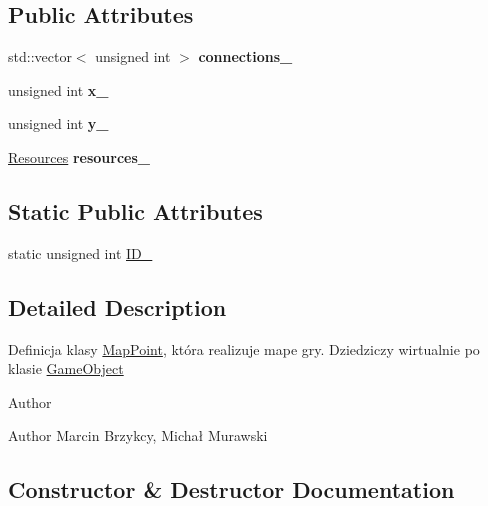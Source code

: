 \subsection*{Public Attributes}
\begin{DoxyCompactItemize}
\item 
std\+::vector$<$ unsigned int $>$ {\bfseries connections\+\_\+}\hypertarget{classMapPoint_a4f0cab12abdeeb18753cbb4416a8fb37}{}\label{classMapPoint_a4f0cab12abdeeb18753cbb4416a8fb37}

\item 
unsigned int {\bfseries x\+\_\+}\hypertarget{classMapPoint_a1fa7c8a815156960b43952e123091533}{}\label{classMapPoint_a1fa7c8a815156960b43952e123091533}

\item 
unsigned int {\bfseries y\+\_\+}\hypertarget{classMapPoint_a37d68b5a84c43739ce77661d5f94cc35}{}\label{classMapPoint_a37d68b5a84c43739ce77661d5f94cc35}

\item 
\hyperlink{classResources}{Resources} {\bfseries resources\+\_\+}\hypertarget{classMapPoint_a9353037bd3a732910600e281dca0e6d1}{}\label{classMapPoint_a9353037bd3a732910600e281dca0e6d1}

\end{DoxyCompactItemize}
\subsection*{Static Public Attributes}
\begin{DoxyCompactItemize}
\item 
static unsigned int \hyperlink{classMapPoint_a0ec6add3c90e5cd5421de9f488d5e681}{I\+D\+\_\+}
\end{DoxyCompactItemize}


\subsection{Detailed Description}
Definicja klasy \hyperlink{classMapPoint}{Map\+Point}, która realizuje mape gry. Dziedziczy wirtualnie po klasie \hyperlink{classGameObject}{Game\+Object} \begin{DoxyAuthor}{Author}

\end{DoxyAuthor}
\begin{DoxyParagraph}{Author}
Marcin Brzykcy, Michał Murawski 
\end{DoxyParagraph}


\subsection{Constructor \& Destructor Documentation}
